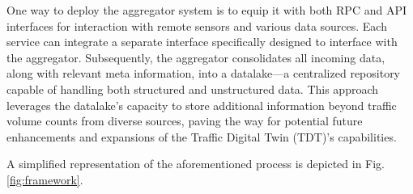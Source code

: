 One way to deploy the aggregator system is to equip it with both RPC and API interfaces for interaction with remote sensors and various data sources. Each service can integrate a separate interface specifically designed to interface with the aggregator. Subsequently, the aggregator consolidates all incoming data, along with relevant meta information, into a datalake—a centralized repository capable of handling both structured and unstructured data. This approach leverages the datalake's capacity to store additional information beyond traffic volume counts from diverse sources, paving the way for potential future enhancements and expansions of the Traffic Digital Twin (TDT)'s capabilities.

A simplified representation of the aforementioned process is depicted in Fig. \ref{fig:framework}.